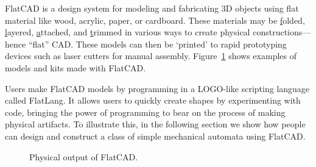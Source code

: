 \documentclass[times, 10pt,twocolumn]{article}
\begin{document}
\nohyphens{FlatCAD} is a design system for modeling and fabricating 3D
objects using flat material like wood, acrylic, paper, or
cardboard. These materials may be \underline{f}olded,
\underline{l}ayered, \underline{a}ttached, and \underline{t}rimmed in
various ways to create physical constructions---hence ``flat''
CAD. These models can then be `printed' to rapid prototyping devices
such as laser cutters for manual
assembly. Figure~\ref{fig:physical-output} shows examples of models
and kits made with \nohyphens{FlatCAD}.

Users make \nohyphens{FlatCAD} models by programming in a LOGO-like
scripting language called \nohyphens{FlatLang}. It allows users to
quickly create shapes by experimenting with code, bringing the power
of programming to bear on the process of making physical artifacts. To
illustrate this, in the following section we show how people can
design and construct a class of simple mechanical automata using
\nohyphens{FlatCAD}.

\begin{figure}
   \centering
   \hspace{2mm}
   \hspace{2mm}
   \caption{Physical output of \nohyphens{FlatCAD}.}
   \label{fig:physical-output}
\end{figure}
\end{document}
